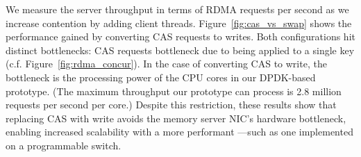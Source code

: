 We measure the server throughput in terms of RDMA requests per second as
we increase contention by adding client threads.
Figure~\ref{fig:cas_vs_swap} shows the performance gained by
converting CAS requests to writes. Both configurations hit distinct
bottlenecks: CAS requests bottleneck due to being applied to a
single key (c.f. Figure~\ref{fig:rdma_concur}). In the case of
converting CAS to write, the bottleneck is the processing power of the
CPU cores in our DPDK-based {\sword} prototype. (The maximum throughput
our prototype can process is 2.8 million requests per second per
core.)
Despite this restriction, these results show that
replacing CAS with write avoids the memory server NIC's hardware
bottleneck, enabling increased scalability with a more performant
{\sword}---such as one implemented on a programmable switch.
